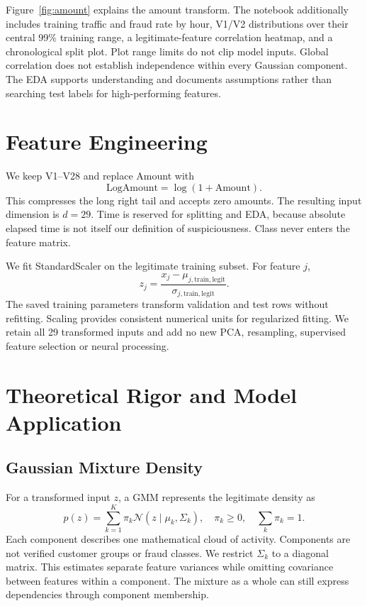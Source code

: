 \documentclass[conference]{IEEEtran}
\begin{document}
Figure~\ref{fig:amount} explains the amount transform. The notebook additionally includes training traffic and fraud rate by hour, V1/V2 distributions over their central 99\% training range, a legitimate-feature correlation heatmap, and a chronological split plot. Plot range limits do not clip model inputs. Global correlation does not establish independence within every Gaussian component. The EDA supports understanding and documents assumptions rather than searching test labels for high-performing features.

\section{Feature Engineering}
We keep V1--V28 and replace Amount with
\begin{equation}
\mathrm{LogAmount}=\log(1+\mathrm{Amount}).
\end{equation}
This compresses the long right tail and accepts zero amounts. The resulting input dimension is $d=29$. Time is reserved for splitting and EDA, because absolute elapsed time is not itself our definition of suspiciousness. Class never enters the feature matrix.

We fit StandardScaler on the legitimate training subset. For feature $j$,
\begin{equation}
z_j=\frac{x_j-\mu_{j,\mathrm{train,legit}}}{\sigma_{j,\mathrm{train,legit}}}.
\end{equation}
The saved training parameters transform validation and test rows without refitting. Scaling provides consistent numerical units for regularized fitting. We retain all 29 transformed inputs and add no new PCA, resampling, supervised feature selection or neural processing.

\section{Theoretical Rigor and Model Application}
\subsection{Gaussian Mixture Density}
For a transformed input $z$, a GMM represents the legitimate density as
\begin{equation}
p(z)=\sum_{k=1}^{K}\pi_k\mathcal{N}(z\mid\mu_k,\Sigma_k),\quad
\pi_k\geq0,\quad\sum_k\pi_k=1.
\end{equation}
Each component describes one mathematical cloud of activity. Components are not verified customer groups or fraud classes. We restrict $\Sigma_k$ to a diagonal matrix. This estimates separate feature variances while omitting covariance between features within a component. The mixture as a whole can still express dependencies through component membership.
\end{document}
